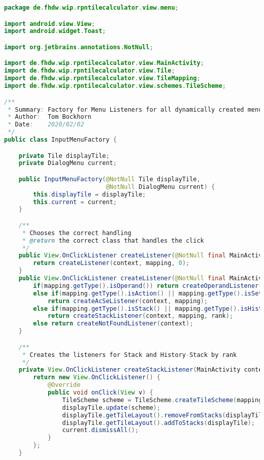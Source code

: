 \begin{lstlisting}[caption=InputMenuFactory,label=list:InputMenuFactory,language=Java]
package de.fhdw.wip.rpntilecalculator.view.menu;

import android.view.View;
import android.widget.Toast;

import org.jetbrains.annotations.NotNull;

import de.fhdw.wip.rpntilecalculator.view.MainActivity;
import de.fhdw.wip.rpntilecalculator.view.Tile;
import de.fhdw.wip.rpntilecalculator.view.TileMapping;
import de.fhdw.wip.rpntilecalculator.view.schemes.TileScheme;

/**
 * Summary: Factory for Menu Listeners for all dynamically created menus
 * Author:  Tom Bockhorn
 * Date:    2020/02/02
 */
public class InputMenuFactory {

    private Tile displayTile;
    private DialogMenu current;

    public InputMenuFactory(@NotNull Tile displayTile,
                            @NotNull DialogMenu current) {
        this.displayTile = displayTile;
        this.current = current;
    }

    /**
     * Chooses the correct handling
     * @return the correct class that handles the click
     */
    public View.OnClickListener createListener(@NotNull final MainActivity context, @NotNull TileMapping mapping) {
        return createListener(context, mapping, 0);
    }
    public View.OnClickListener createListener(@NotNull final MainActivity context, @NotNull TileMapping mapping, int rank) {
        if(mapping.getType().isOperand()) return createOperandListener(context, mapping);
        else if(mapping.getType().isAction() || mapping.getType().isSetting())
            return createAcSeListener(context, mapping);
        else if(mapping.getType().isStack() || mapping.getType().isHistory())
            return createStackListener(context, mapping, rank);
        else return createNotFoundListener(context);
    }

    /**
     * Creates the listeners for Stack and History-Stack by rank
     */
    private View.OnClickListener createStackListener(MainActivity context, final TileMapping mapping, final int rank) {
        return new View.OnClickListener() {
            @Override
            public void onClick(View v) {
                TileScheme scheme = TileScheme.createTileScheme(mapping, null, rank);
                displayTile.update(scheme);
                displayTile.getTileLayout().removeFromStacks(displayTile);
                displayTile.getTileLayout().addToStacks(displayTile);
                current.dismissAll();
            }
        };
    }


\end{lstlisting}
